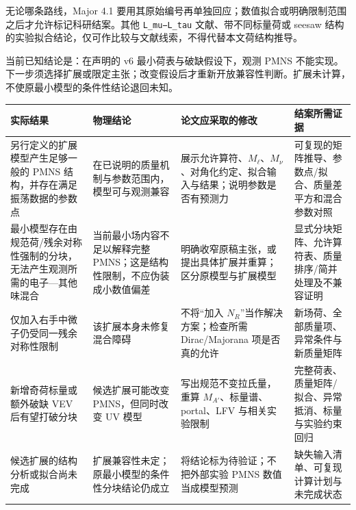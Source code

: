 \documentclass[
  chinese,
  UTF8]{ctexart}
\newcounter{none} %
\begin{document}
无论哪条路线，Major 4.1
要用其原始编号再单独回应；数值拟合或明确限制范围之后才允许标记科研结案。其他
\texttt{L\_mu−L\_tau} 文献、带不同标量荷或 seesaw
结构的实验拟合结论，仅可作比较与文献线索，不得代替本文荷结构推导。

当前已知结论是：在声明的 v6 最小荷表与破缺假设下，观测 PMNS
不能实现。下一步须选择扩展或限定主张；改变假设后才重新开放兼容性判断。扩展未计算，不使原最小模型的条件性结论退回未知。

{\def\LTcaptype{none} %
\begin{longtable}[]{@{}
  >{\raggedright\arraybackslash}p{}
  >{\raggedright\arraybackslash}p{}
  >{\raggedright\arraybackslash}p{}
  >{\raggedright\arraybackslash}p{}@{}}
\toprule\noalign{}
\begin{minipage}[b]{\linewidth}\raggedright
实际结果
\end{minipage} & \begin{minipage}[b]{\linewidth}\raggedright
物理结论
\end{minipage} & \begin{minipage}[b]{\linewidth}\raggedright
论文应采取的修改
\end{minipage} & \begin{minipage}[b]{\linewidth}\raggedright
结案所需证据
\end{minipage} \\
\midrule\noalign{}
\endhead
\bottomrule\noalign{}
\endlastfoot
另行定义的扩展模型产生足够一般的 PMNS 结构，并存在满足振荡数据的参数点 &
在已说明的质量机制与参数范围内，模型可与观测兼容 &
展示允许算符、\(M_\ell\)、\(M_\nu\)、对角化约定、拟合输入与结果；说明参数是否有预测力
& 可复现的矩阵推导、参数点/拟合、质量差平方和混合参数对照 \\
最小模型存在由规范荷/残余对称性强制的分块，无法产生观测所需的电子---其他味混合
& 当前最小场内容不足以解释完整
PMNS；这是结构性限制，不应伪装成小数值偏差 &
明确收窄原稿主张，或提出具体扩展并重算；区分原模型与扩展模型 &
显式分块矩阵、允许算符表、质量排序/简并处理及不兼容证明 \\
仅加入右手中微子仍受同一残余对称性限制 & 该扩展本身未修复混合障碍 &
不将``加入 \(N_R\)''当作解决方案；检查所需 Dirac/Majorana 项是否真的允许
& 新场荷、全部质量项、异常条件与新质量矩阵 \\
新增奇荷标量或额外破缺 VEV 后有望打破分块 & 候选扩展可能改变
PMNS，但同时改变 UV 模型 & 写出规范不变拉氏量，重算
\(M_{A'}\)、标量谱、portal、LFV 与相关实验限制 &
完整荷表、质量矩阵/拟合、异常抵消、标量与实验约束回归 \\
候选扩展的结构分析或拟合尚未完成 &
扩展兼容性未定；原最小模型的条件性分块结论仍成立 &
将结论标为待验证；不把外部实验 PMNS 数值当成模型预测 &
缺失输入清单、可复现计算计划与未完成状态 \\
\end{longtable}
}
\end{document}
